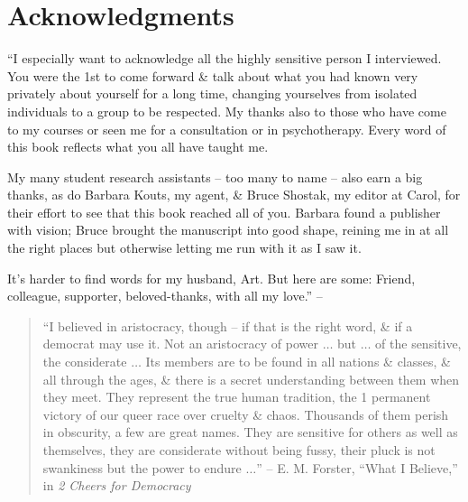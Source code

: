 \documentclass{article}
\numberwithin{equation}{section}
\begin{document}
\section*{Acknowledgments}
``I especially want to acknowledge all the highly sensitive person I interviewed. You were the 1st to come forward \& talk about what you had known very privately about yourself for a long time, changing yourselves from isolated individuals to a group to be respected. My thanks also to those who have come to my courses or seen me for a consultation or in psychotherapy. Every word of this book reflects what you all have taught me.

My many student research assistants -- too many to name -- also earn a big thanks, as do Barbara Kouts, my agent, \& Bruce Shostak, my editor at Carol, for their effort to see that this book reached all of you. Barbara found a publisher with vision; Bruce brought the manuscript into good shape, reining me in at all the right places but otherwise letting me run with it as I saw it.

It's harder to find words for my husband, Art. But here are some: Friend, colleague, supporter, beloved-thanks, with all my love.'' -- \cite[p. 6]{Aron2013}

\begin{quotation}
	``I believed in aristocracy, though -- if that is the right word, \& if a democrat may use it. Not an aristocracy of power $\ldots$ but $\ldots$ of the sensitive, the considerate $\ldots$ Its members are to be found in all nations \& classes, \& all through the ages, \& there is a secret understanding between them when they meet. They represent the true human tradition, the 1 permanent victory of our queer race over cruelty \& chaos. Thousands of them perish in obscurity, a few are great names. They are sensitive for others as well as themselves, they are considerate without being fussy, their pluck is not swankiness but the power to endure $\ldots$'' -- E. M. Forster, ``What I Believe,'' in \textit{2 Cheers for Democracy} 
\end{quotation}

\end{document}
